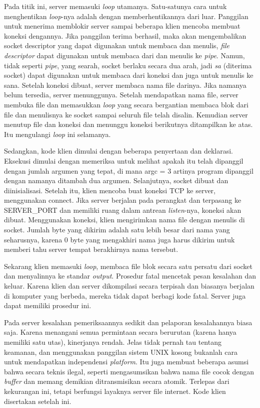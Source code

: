 Pada titik ini, server memasuki \emph{loop} utamanya. Satu-satunya cara untuk menghentikan \emph{loop}-nya adalah dengan memberhentikannya dari luar. Panggilan untuk menerima memblokir server sampai beberapa klien mencoba membuat koneksi dengannya. Jika panggilan terima berhasil, maka akan mengembalikan socket descriptor yang dapat digunakan untuk membaca dan menulis, \emph{file descriptor} dapat digunakan untuk membaca dari dan menulis ke \emph{pipe}. Namun, tidak seperti \emph{pipe}, yang searah, socket berlaku secara dua arah, jadi \emph{sa} (diterima socket) dapat digunakan untuk membaca dari koneksi dan juga untuk menulis ke sana. Setelah koneksi dibuat, server membaca nama file darinya. Jika namanya belum tersedia, server menunggunya. Setelah mendapatkan nama file, server membuka file dan memasukkan \emph{loop} yang secara bergantian membaca blok dari file dan menulisnya ke socket sampai seluruh file telah disalin. Kemudian server menutup file dan koneksi dan menunggu koneksi berikutnya ditampilkan ke atas. Itu mengulangi \emph{loop} ini selamanya.

Sedangkan, kode klien dimulai dengan beberapa penyertaan dan deklarasi. Eksekusi dimulai dengan memeriksa untuk melihat apakah itu telah dipanggil dengan jumlah argumen yang tepat, di mana argc = 3 artinya program dipanggil dengan namanya ditambah dua argumen. Selanjutnya, socket dibuat dan diinisialisasi. Setelah itu, klien mencoba buat koneksi TCP ke server, menggunakan connect. Jika server berjalan pada perangkat dan terpasang ke SERVER\_PORT dan  memiliki ruang dalam antrean \emph{listen}-nya, koneksi akan dibuat. Menggunakan koneksi, klien mengirimkan nama file dengan menulis di socket. Jumlah byte yang dikirim adalah satu lebih besar dari nama yang seharusnya, karena 0 byte yang mengakhiri nama juga harus dikirim untuk memberi tahu server tempat berakhirnya nama tersebut.

Sekarang klien memasuki \emph{loop}, membaca file blok secara satu persatu dari socket dan menyalinnya ke standar \emph{output}. Prosedur fatal mencetak pesan kesalahan dan keluar. Karena klien dan server dikompilasi secara terpisah dan biasanya berjalan di komputer yang berbeda, mereka tidak dapat berbagi kode fatal. Server juga dapat memiliki prosedur ini.

Pada server kesalahan pemeriksaannya sedikit dan pelaporan kesalahannya biasa saja. Karena menangani semua permintaan secara berurutan (karena hanya memiliki satu utas), kinerjanya rendah. Jelas tidak pernah tau tentang keamanan, dan menggunakan panggilan sistem UNIX kosong bukanlah cara untuk mendapatkan independensi \emph{platform}. Itu juga membuat beberapa asumsi bahwa secara teknis ilegal, seperti mengasumsikan bahwa nama file cocok dengan \emph{buffer} dan memang demikian ditransmisikan secara atomik. Terlepas dari kekurangan ini, tetapi berfungsi layaknya server file internet. Kode klien disertakan setelah ini.

